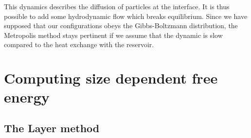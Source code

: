 This dynamics describes the diffusion of particles at the interface. It is thus possible to add some hydrodynamic flow which breaks equilibrium. Since we have supposed that our configurations obeys the Gibbs-Boltzmann distribution, the Metropolis method stays pertinent if we assume that the dynamic is slow compared to the heat exchange with the reservoir.

\section{Computing size dependent free energy}

\subsection{The Layer method}

